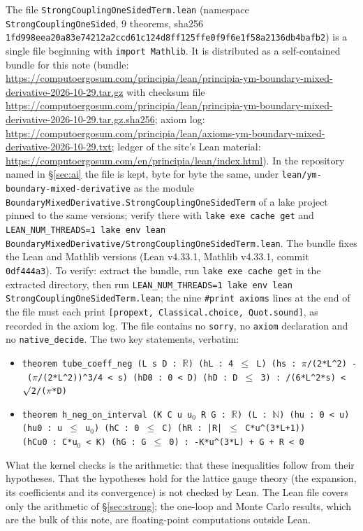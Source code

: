 \documentclass[11pt,a4paper]{article}
\theoremstyle{definition}
\theoremstyle{remark}
\begin{document}
{\sloppy The file \texttt{StrongCouplingOneSidedTerm.lean} (namespace \texttt{StrongCouplingOneSided}, 9 theorems, sha256 \texttt{1fd998ee\allowbreak{}a20a83e7\allowbreak{}4212a2cc\allowbreak{}d61c124d\allowbreak{}8ff125ff\allowbreak{}e0f9f6e1\allowbreak{}f58a2136\allowbreak{}db4bafb2}) is a single file beginning with \texttt{import Mathlib}. It is distributed as a self-contained bundle for this note (bundle: \url{https://computoergosum.com/principia/lean/principia-ym-boundary-mixed-derivative-2026-10-29.tar.gz} with checksum file \url{https://computoergosum.com/principia/lean/principia-ym-boundary-mixed-derivative-2026-10-29.tar.gz.sha256}; axiom log: \url{https://computoergosum.com/principia/lean/axioms-ym-boundary-mixed-derivative-2026-10-29.txt}; ledger of the site's Lean material: \url{https://computoergosum.com/en/principia/lean/index.html}). In the repository named in \S\ref{sec:ai} the file is kept, byte for byte the same, under \texttt{lean/\allowbreak{}ym-boundary-mixed-derivative} as the module \texttt{BoundaryMixedDerivative.\allowbreak{}StrongCouplingOneSidedTerm} of a lake project pinned to the same versions; verify there with \texttt{lake exe cache get} and \texttt{LEAN\_NUM\_THREADS=1 lake env lean BoundaryMixedDerivative/\allowbreak{}StrongCouplingOneSidedTerm.lean}. The bundle fixes the Lean and Mathlib versions (Lean v4.33.1, Mathlib v4.33.1, commit \texttt{0df444a3}). To verify: extract the bundle, run \texttt{lake exe cache get} in the extracted directory, then run \texttt{LEAN\_NUM\_THREADS=1 lake env lean StrongCouplingOneSidedTerm.lean}; the nine \texttt{\#print axioms} lines at the end of the file must each print \texttt{[propext, Classical.choice, Quot.sound]}, as recorded in the axiom log. The file contains no \texttt{sorry}, no \texttt{axiom} declaration and no \texttt{native\_decide}. The two key statements, verbatim:\par}
\begin{itemize}[leftmargin=2em]\raggedright
\item \texttt{theorem~tube\_coeff\_neg \allowbreak (L~s~D~:~\ensuremath{\mathbb{R}}) \allowbreak (hL~:~4~\ensuremath{\le}~L) \allowbreak (hs~:~\ensuremath{\pi}/(2*L\^{}2)~-~(\ensuremath{\pi}/(2*L\^{}2))\^{}3/4~<~s) \allowbreak (hD0~:~0~<~D) \allowbreak (hD~:~D~\ensuremath{\le}~3)~: /(6*L\^{}2*s)~<~\ensuremath{\surd}2/(\ensuremath{\pi}*D)}
\item \texttt{theorem~h\_neg\_on\_interval \allowbreak (K~C~u~u\ensuremath{_0}~R~G~:~\ensuremath{\mathbb{R}}) \allowbreak (L~:~\ensuremath{\mathbb{N}}) \allowbreak (hu~:~0~<~u) \allowbreak (hu0~:~u~\ensuremath{\le}~u\ensuremath{_0}) \allowbreak (hC~:~0~\ensuremath{\le}~C) \allowbreak (hR~:~|R|~\ensuremath{\le}~C*u\^{}(3*L+1)) \allowbreak (hCu0~:~C*u\ensuremath{_0}~<~K) \allowbreak (hG~:~G~\ensuremath{\le}~0)~: \allowbreak -K*u\^{}(3*L)~+~G~+~R~<~0}
\end{itemize}
What the kernel checks is the arithmetic: that these inequalities follow from their hypotheses. That the hypotheses hold for the lattice gauge theory (the expansion, its coefficients and its convergence) is not checked by Lean. The Lean file covers only the arithmetic of \S\ref{sec:strong}; the one-loop and Monte Carlo results, which are the bulk of this note, are floating-point computations outside Lean.
\end{document}
